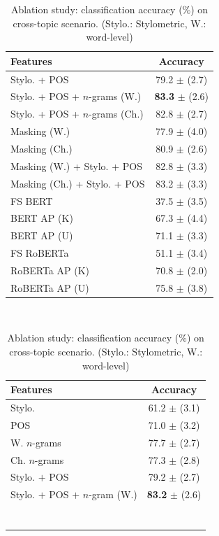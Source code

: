 \documentclass[11pt]{article}
\begin{document}
\begin{table}[ht]
\parbox{.45\linewidth}{
\centering
\begin{tabular}{l|c|}
\hline
\textbf{Features}   & \textbf{Accuracy} \\
\hline
Stylo. + POS        & 79.2  $\pm$ (2.7)\\ 
Stylo. + POS +  $n$-grams (W.)   &  \textbf{83.3}  $\pm$ (2.6)\\ 
Stylo. + POS +  $n$-grams (Ch.)  &   82.8 $\pm$ (2.7)\\
Masking (W.)      & 77.9  $\pm$ (4.0)\\ 
Masking (Ch.)     & 80.9  $\pm$ (2.6)\\ 
Masking (W.) + Stylo. + POS      & 82.8  $\pm$ (3.3)\\
Masking (Ch.) + Stylo. + POS     & 83.2  $\pm$ (3.3)\\ 
FS BERT  & 37.5 $\pm$ (3.5)\\
BERT AP (K) & 67.3 $\pm$ (4.4)\\
BERT AP (U) & 71.1 $\pm$ (3.3)\\
FS RoBERTa  & 51.1 $\pm$ (3.4)\\
RoBERTa AP (K) & 70.8 $\pm$ (2.0)\\
RoBERTa AP (U) & 75.8 $\pm$ (3.8)\\
\hline
\end{tabular}
\caption{Average cross-topic classification accuracy (\%) on the extended Guardian dataset (W.: word-level, Ch.: character-level).\label{classification}}}
~~~~
\parbox{.45\linewidth}{
\begin{tabular}{|l|c}
\hline 
\textbf{Features} & \textbf{Accuracy}\\
\hline 
Stylo. &  61.2 $\pm$ (3.1)\\
POS & 71.0 $\pm$ (3.2)\\
W. $n$-grams & 77.7 $\pm$ (2.7) \\ 
Ch. $n$-grams & 77.3 $\pm$ (2.8) \\ 
Stylo. $+$ POS   &  79.2 $\pm$ (2.7) \\
Stylo. $+$ POS $+$ $n$-gram (W.) & \textbf{83.2} $\pm$ (2.6) \\
\phantom{Masking (Ch.) + Stylo. + POS}  & \\
\\\\\\\\\\\\
\hline
\end{tabular}
\caption{\label{ablatioin}
Ablation study: classification accuracy ($\%$) on cross-topic scenario. (Stylo.: Stylometric, W.: word-level)}}
\end{table}
\end{document}
